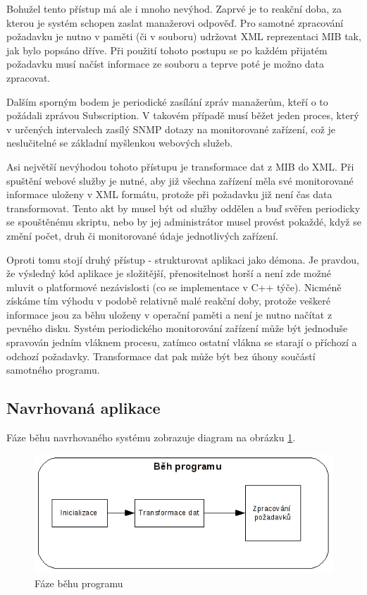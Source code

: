 Bohužel tento přístup má ale i mnoho nevýhod. Zaprvé je to reakční doba, za kterou je systém schopen zaslat manažerovi odpověď. Pro samotné zpracování požadavku
je nutno v paměti (či v souboru) udržovat XML reprezentaci MIB tak, jak bylo popsáno dříve. Při použití tohoto postupu se po každém přijatém požadavku musí načíst informace ze souboru
a teprve poté je možno data zpracovat.

Dalším sporným bodem je periodické zasílání zpráv manažerům, kteří o to požádali zprávou Subscription. V takovém případě musí běžet jeden proces, který v určených intervalech zasílý SNMP
dotazy na monitorované zařízení, což je neslučitelné se základní myšlenkou webových služeb.

Asi největší nevýhodou tohoto přístupu je transformace dat z MIB do XML. Při spuštění webové služby je nutné, aby již všechna zařízení měla své monitorované informace uloženy v XML formátu, 
protože při požadavku již není čas data transformovat. Tento akt by musel být od služby oddělen a buď svěřen periodicky se spouštěnému skriptu, nebo by jej administrátor musel provést pokaždé,
když se změní počet, druh či monitorované údaje jednotlivých zařízení.

Oproti tomu stojí druhý přístup - strukturovat aplikaci jako démona. Je pravdou, že výsledný kód aplikace je složitější, přenositelnost horší a není zde možné mluvit o platformové nezávislosti (co se implementace v C++ týče).
Nicméně získáme tím výhodu v podobě relativně malé reakční doby, protože veškeré informace jsou za běhu uloženy v operační paměti a není je nutno načítat z pevného disku. Systém periodického monitorování
zařízení může být jednoduše spravován jedním vláknem procesu, zatímco ostatní vlákna se starají o příchozí a odchozí požadavky. Transformace dat pak může být bez úhony součástí samotného programu.

\subsection{Navrhovaná aplikace}
Fáze běhu navrhovaného systému zobrazuje diagram na obrázku \ref{obr_an_beh_programu}.

\begin{figure}[htp]
	\begin{center}
		\includegraphics{obrazky/04_beh_programu.png}
		\caption{Fáze běhu programu}
		\label{obr_an_beh_programu}
	\end{center}
\end{figure}

